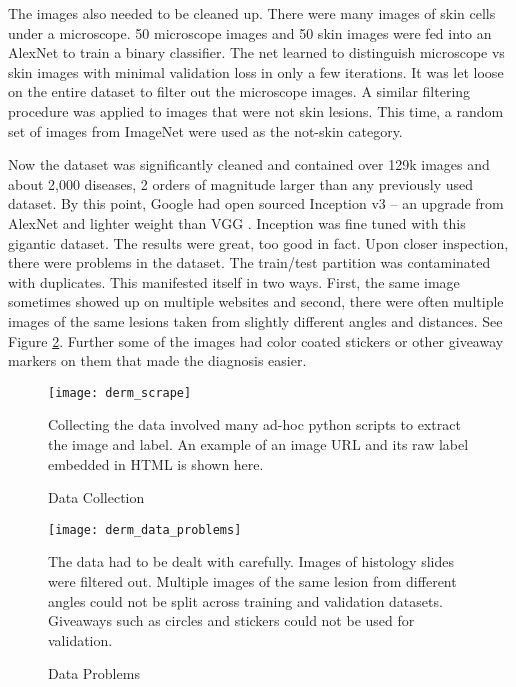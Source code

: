 The images also needed to be cleaned up.  There were many images of skin cells under a microscope.  50 microscope images and 50 skin images were fed into an AlexNet to train a binary classifier.  The net learned to distinguish microscope vs skin images with minimal validation loss in only a few iterations.  It was let loose on the entire dataset to filter out the microscope images.  A similar filtering procedure was applied to images that were not skin lesions.  This time, a random set of images from ImageNet were used as the not-skin category.

Now the dataset was significantly cleaned and contained over 129k images and about 2,000 diseases, 2 orders of magnitude larger than any previously used dataset.  By this point, Google had open sourced Inception v3 \cite{szegedy2016rethinking} -- an upgrade from AlexNet \cite{krizhevsky2012imagenet} and lighter weight than VGG \cite{simonyan2014very}.  Inception was fine tuned with this gigantic dataset.  The results were great, too good in fact.  Upon closer inspection, there were problems in the dataset.  The train/test partition was contaminated with duplicates.  This manifested itself in two ways.  First, the same image sometimes showed up on multiple websites and second, there were often multiple images of the same lesions taken from slightly different angles and distances.  See Figure \ref{fig:derm_data_problems}.  Further some of the images had color coated stickers or other giveaway markers on them that made the diagnosis easier.

\begin{figure}
\texttt{[image: derm\_scrape]}
\caption{Data Collection}
\vspace{12px}
Collecting the data involved many ad-hoc python scripts to extract the image and label.  An example of an image URL and its raw label embedded in HTML is shown here.
\label{fig:derm_scrape}
\end{figure}

\begin{figure}
\texttt{[image: derm\_data\_problems]}
\caption{Data Problems}
\vspace{12px}
The data had to be dealt with carefully.  Images of histology slides were filtered out.  Multiple images of the same lesion from different angles could not be split across training and validation datasets.  Giveaways such as circles and stickers could not be used for validation.
\label{fig:derm_data_problems}
\end{figure}

